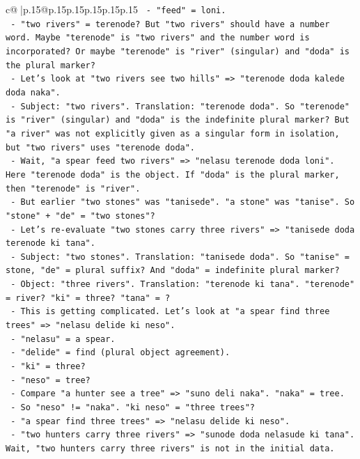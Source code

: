 \documentclass{article}
\begin{document}
{\begin{supertabular}{c@{$\;$}|p{.15\linewidth}@{}p{.15\linewidth}p{.15\linewidth}p{.15\linewidth}p{.15\linewidth}p{.15\linewidth}}
{{{\texttt{   {-} "feed" = loni.} \\
\texttt{   {-} "two rivers" = terenode? But "two rivers" should have a number word. Maybe "terenode" is "two rivers" and the number word is incorporated? Or maybe "terenode" is "river" (singular) and "doda" is the plural marker?} \\
\texttt{   {-} Let's look at "two rivers see two hills" => "terenode doda kalede doda naka".} \\
\texttt{     {-} Subject: "two rivers". Translation: "terenode doda". So "terenode" is "river" (singular) and "doda" is the indefinite plural marker? But "a river" was not explicitly given as a singular form in isolation, but "two rivers" uses "terenode doda".} \\
\texttt{     {-} Wait, "a spear feed two rivers" => "nelasu terenode doda loni". Here "terenode doda" is the object. If "doda" is the plural marker, then "terenode" is "river".} \\
\texttt{     {-} But earlier "two stones" was "tanisede". "a stone" was "tanise". So "stone" + "de" = "two stones"?} \\
\texttt{     {-} Let's re{-}evaluate "two stones carry three rivers" => "tanisede doda terenode ki tana".} \\
\texttt{       {-} Subject: "two stones". Translation: "tanisede doda". So "tanise" = stone, "de" = plural suffix? And "doda" = indefinite plural marker?} \\
\texttt{       {-} Object: "three rivers". Translation: "terenode ki tana". "terenode" = river? "ki" = three? "tana" = ?} \\
\texttt{       {-} This is getting complicated. Let's look at "a spear find three trees" => "nelasu delide ki neso".} \\
\texttt{         {-} "nelasu" = a spear.} \\
\texttt{         {-} "delide" = find (plural object agreement).} \\
\texttt{         {-} "ki" = three?} \\
\texttt{         {-} "neso" = tree?} \\
\texttt{       {-} Compare "a hunter see a tree" => "suno deli naka". "naka" = tree.} \\
\texttt{       {-} So "neso" != "naka". "ki neso" = "three trees"?} \\
\texttt{       {-} "a spear find three trees" => "nelasu delide ki neso".} \\
\texttt{       {-} "two hunters carry three rivers" => "sunode doda nelasude ki tana". Wait, "two hunters carry three rivers" is not in the initial data.} \\
}}}
\end{supertabular}}
\end{document}
